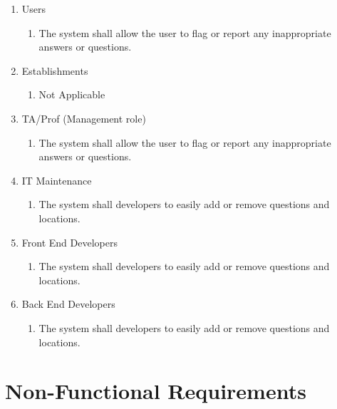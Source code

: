 \documentclass[titlepage]{article}
\newcounter{req}
\begin{document}
\begin{enumerate}[{BE1}]
\begin{enumerate}[{VP5.1}]
				\item Users
				\begin{enumerate}
					\item The system shall allow the user to flag or report any inappropriate answers or questions.
				\end{enumerate}
				
				\item Establishments
				\begin{enumerate}
					\item Not Applicable
				\end{enumerate}
				
				\item TA/Prof (Management role)
				\begin{enumerate}
					\item The system shall allow the user to flag or report any inappropriate answers or questions.
				\end{enumerate}
				
				\item IT Maintenance
				\begin{enumerate}
					\item The system shall developers to easily add or remove questions and locations.
				\end{enumerate}
				
				\item Front End Developers
				\begin{enumerate}
					\item The system shall developers to easily add or remove questions and locations.
				\end{enumerate}
				
				\item Back End Developers
				\begin{enumerate}
					\item The system shall developers to easily add or remove questions and locations.
				\end{enumerate}
			\end{enumerate}
			
		\end{enumerate}
		
		\section{Non-Functional Requirements}
		\label{sec:non-functional_requirements}
		
\end{document}
